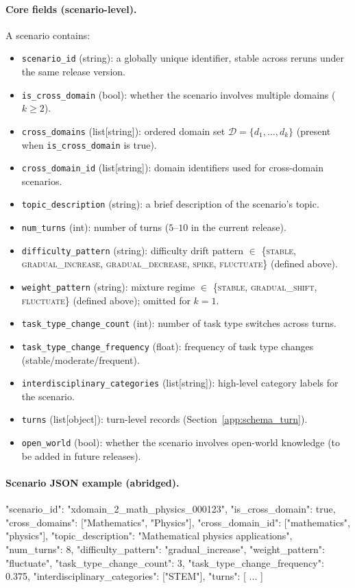 \paragraph{Core fields (scenario-level).}
A scenario contains:
\begin{itemize}
    \item \texttt{scenario\_id} (string): a globally unique identifier, stable across reruns under the same release version.
    \item \texttt{is\_cross\_domain} (bool): whether the scenario involves multiple domains ($k\ge2$).
    \item \texttt{cross\_domains} (list[string]): ordered domain set $\mathcal{D}=\{d_1,\ldots,d_k\}$ (present when \texttt{is\_cross\_domain} is true).
    \item \texttt{cross\_domain\_id} (list[string]): domain identifiers used for cross-domain scenarios.
    \item \texttt{topic\_description} (string): a brief description of the scenario's topic.
    \item \texttt{num\_turns} (int): number of turns ($5$--$10$ in the current release).
    \item \texttt{difficulty\_pattern} (string): difficulty drift pattern $\in$ \{\textsc{stable}, \textsc{gradual\_increase}, \textsc{gradual\_decrease}, \textsc{spike}, \textsc{fluctuate}\} (defined above).
    \item \texttt{weight\_pattern} (string): mixture regime $\in$ \{\textsc{stable}, \textsc{gradual\_shift}, \textsc{fluctuate}\} (defined above); omitted for $k=1$.
    \item \texttt{task\_type\_change\_count} (int): number of task type switches across turns.
    \item \texttt{task\_type\_change\_frequency} (float): frequency of task type changes (stable/moderate/frequent).
    \item \texttt{interdisciplinary\_categories} (list[string]): high-level category labels for the scenario.
    \item \texttt{turns} (list[object]): turn-level records (Section~\ref{app:schema_turn}).
    \item \texttt{open\_world} (bool): whether the scenario involves open-world knowledge (to be added in future releases).
\end{itemize}

\paragraph{Scenario JSON example (abridged).}
\begin{XDBVerbatim}
{
  "scenario_id": "xdomain_2_math_physics_000123",
  "is_cross_domain": true,
  "cross_domains": ["Mathematics", "Physics"],
  "cross_domain_id": ["mathematics", "physics"],
  "topic_description": "Mathematical physics applications",
  "num_turns": 8,
  "difficulty_pattern": "gradual_increase",
  "weight_pattern": "fluctuate",
  "task_type_change_count": 3,
  "task_type_change_frequency": 0.375,
  "interdisciplinary_categories": ["STEM"],
  "turns": [ ... ]
}
\end{XDBVerbatim}

